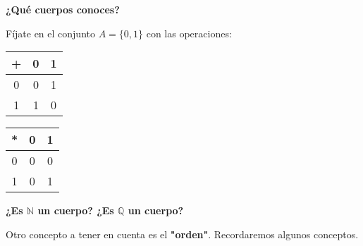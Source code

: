 \documentclass[12pt]{article}
\begin{document}
\textbf{¿Qué cuerpos conoces?}

Fíjate en el conjunto $A=\{0,1\}$ con las operaciones:
\begin{center}
	\begin{tabular}{|c|c|c|}
		\hline
		+ & 0 & 1 \\
		\hline
		0 & 0 & 1 \\
		\hline
		1 & 1 & 0 \\
		\hline
	\end{tabular}\hspace{3cm}
	\begin{tabular}{|c|c|c|}
		\hline
		* & 0 & 1 \\
		\hline
		0 & 0 & 0 \\
		\hline
		1 & 0 & 1 \\
		\hline
	\end{tabular}
\end{center}
\textbf{¿Es $\mathbb{N}$ un cuerpo? ¿Es $\mathbb{Q}$ un cuerpo?}

Otro concepto a tener en cuenta es el \textbf{"orden"}. Recordaremos algunos conceptos. 
\end{document}

